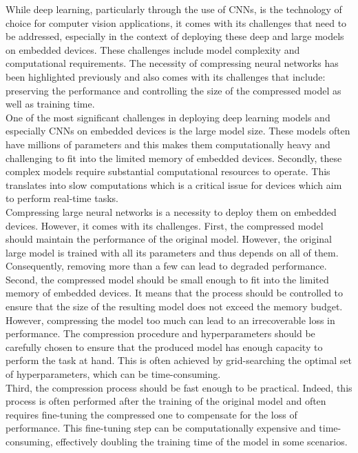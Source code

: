 While deep learning, particularly through the use of \acp{CNN}, is the
technology of choice for computer vision applications, it comes with its
challenges that need to be addressed, especially in the context of deploying
these deep and large models on embedded devices. These challenges include model
complexity and computational requirements. The necessity of compressing neural
networks has been highlighted previously and also comes with its challenges that
include: preserving the performance and controlling the size of the compressed
model as well as training time.\\

One of the most significant challenges in deploying deep learning models and
especially \acp{CNN} on embedded devices is the large model size. These models
often have millions of parameters and this makes them computationally heavy and
challenging to fit into the limited memory of embedded devices. Secondly, these
complex models require substantial computational resources to operate. This
translates into slow computations which is a critical issue for devices which
aim to perform real-time tasks.\\

Compressing large neural networks is a necessity to deploy them on embedded
devices. However, it comes with its challenges. First, the compressed model
should maintain the performance of the original model. However, the original
large model is trained with all its parameters and thus depends on all of them.
Consequently, removing more than a few can lead to degraded performance. \\

Second, the compressed model should be small enough to fit into the limited
memory of embedded devices. It means that the process should be controlled to
ensure that the size of the resulting model does not exceed the memory budget.
However, compressing the model too much can lead to an irrecoverable loss in
performance. The compression procedure and hyperparameters should be carefully
chosen to ensure that the produced model has enough capacity to perform the task
at hand. This is often achieved by grid-searching the optimal set of
hyperparameters, which can be time-consuming.\\

Third, the compression process should be fast enough to be practical. Indeed,
this process is often performed after the training of the original model and
often requires fine-tuning the compressed one to compensate for the loss of
performance. This fine-tuning step can be computationally expensive and
time-consuming, effectively doubling the training time of the model in some
scenarios.\\

